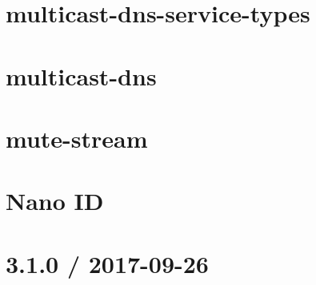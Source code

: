 \documentclass[twoside]{book}
\newcommand{\+}{\discretionary{\mbox{\scriptsize$\hookleftarrow$}}{}{}}
\begin{document}
\chapter{multicast-\/dns-\/service-\/types}
\label{md__c___users_vaishnavi_jadhav__desktop__developer_code_mean_stack_example_client_node_modules_ma335d039bff2369e4122238a0d81a146}

\chapter{multicast-\/dns}
\label{md__c___users_vaishnavi_jadhav__desktop__developer_code_mean_stack_example_client_node_modules_multicast_dns__r_e_a_d_m_e}

\chapter{mute-\/stream}
\label{md__c___users_vaishnavi_jadhav__desktop__developer_code_mean_stack_example_client_node_modules_mute_stream__r_e_a_d_m_e}

\chapter{Nano ID}
\label{md__c___users_vaishnavi_jadhav__desktop__developer_code_mean_stack_example_client_node_modules_nanoid__r_e_a_d_m_e}

\chapter{3.1.0 / 2017-\/09-\/26}
\label{md__c___users_vaishnavi_jadhav__desktop__developer_code_mean_stack_example_client_node_modules_n3bf73168fc7c9552ba6d9c24635469c5}

\end{document}
